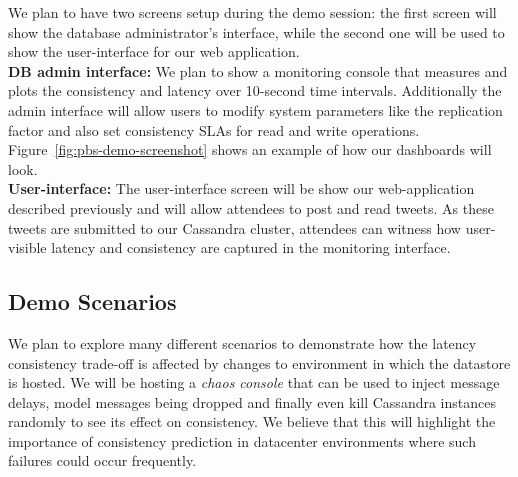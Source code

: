 We plan to have two screens setup during the demo session: the first screen will
show the database administrator's interface, while the second one will be used
to show the user-interface for our web application. \\

\textbf{DB admin interface:} We plan to show a monitoring console that
measures and plots the consistency and latency over 10-second time intervals.
Additionally the admin interface will allow users to modify system parameters
like the replication factor and also set consistency SLAs for read and write
operations. Figure~\ref{fig:pbs-demo-screenshot} shows an example of how our 
dashboards will look. \\

\textbf{User-interface:} The user-interface screen will be show our
web-application described previously and will allow attendees to post and read
tweets. As these tweets are submitted to our Cassandra cluster, attendees can
witness how user-visible latency and consistency are captured in the monitoring
interface. 

\subsection{Demo Scenarios}
We plan to explore many different scenarios to demonstrate how the latency
consistency trade-off is affected by changes to environment in which the
datastore is hosted. We will be hosting a \textit{chaos console} that can be
used to inject message delays, model messages being dropped and finally even
kill Cassandra instances randomly to see its effect on consistency. We believe
that this will highlight the importance of consistency prediction in datacenter
environments where such failures could occur frequently.
